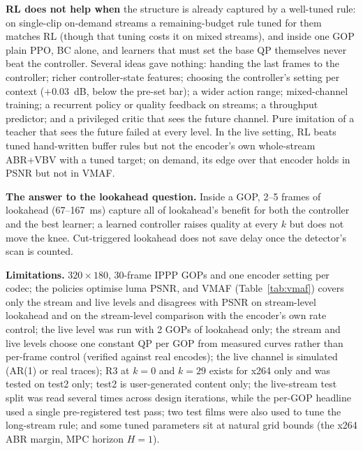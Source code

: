 \documentclass[conference]{IEEEtran}
\begin{document}
\textbf{RL does not help when} the structure is already captured by a well-tuned rule: on single-clip on-demand streams a remaining-budget rule tuned for them matches RL (though that tuning costs it on mixed streams), and inside one GOP plain PPO, BC alone, and learners that must set the base QP themselves never beat the controller. Several ideas gave nothing: handing the last frames to the controller; richer controller-state features; choosing the controller's setting per context ($+0.03$~dB, below the pre-set bar); a wider action range; mixed-channel training; a recurrent policy or quality feedback on streams; a throughput predictor; and a privileged critic that sees the future channel. Pure imitation of a teacher that sees the future failed at every level. In the live setting, RL beats tuned hand-written buffer rules but not the encoder's own whole-stream ABR+VBV with a tuned target; on demand, its edge over that encoder holds in PSNR but not in VMAF.

\textbf{The answer to the lookahead question.} Inside a GOP, 2--5 frames of lookahead (67--167~ms) capture all of lookahead's benefit for both the controller and the best learner; a learned controller raises quality at every $k$ but does not move the knee. Cut-triggered lookahead does not save delay once the detector's scan is counted.

\textbf{Limitations.} $320{\times}180$, 30-frame IPPP GOPs and one encoder setting per codec; the policies optimise luma PSNR, and VMAF (Table~\ref{tab:vmaf}) covers only the stream and live levels and disagrees with PSNR on stream-level lookahead and on the stream-level comparison with the encoder's own rate control; the live level was run with 2 GOPs of lookahead only; the stream and live levels choose one constant QP per GOP from measured curves rather than per-frame control (verified against real encodes); the live channel is simulated (AR(1) or real traces); R3 at $k{=}0$ and $k{=}29$ exists for x264 only and was tested on test2 only; test2 is user-generated content only; the live-stream test split was read several times across design iterations, while the per-GOP headline used a single pre-registered test pass; two test films were also used to tune the long-stream rule; and some tuned parameters sit at natural grid bounds (the x264 ABR margin, MPC horizon $H{=}1$).

\end{document}
